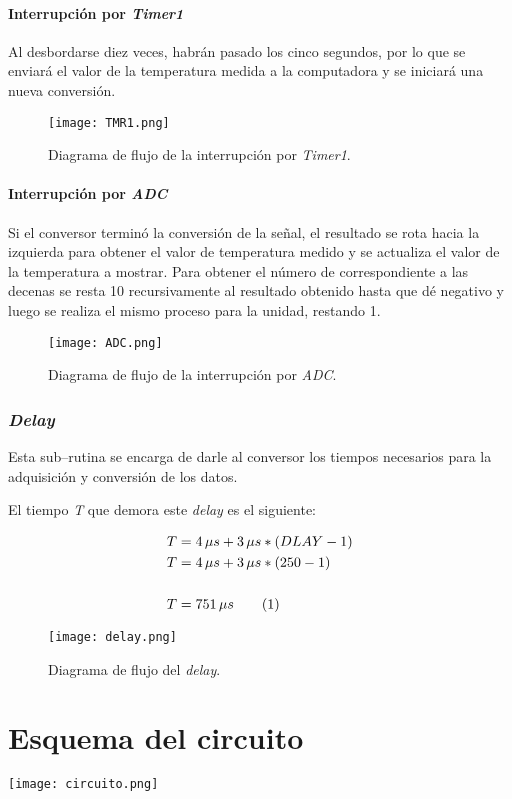 \documentclass[12pt,a4paper]{article}
\newcommand\numberthis{\addtocounter{equation}{1}\tag{\theequation}}
\begin{document}
	\newpage
	\paragraph{Interrupción por \emph{Timer1}} Al desbordarse diez veces, habrán pasado los cinco segundos, por lo que se enviará el valor de la temperatura medida a la computadora y se iniciará una nueva conversión.
	
	\begin{figure}[H]
	\texttt{[image: TMR1.png]}
	\centering
	\caption{Diagrama de flujo de la interrupción por \emph{Timer1}.}
	\label{TM1}
	\end{figure}
	
	\paragraph{Interrupción por \emph{ADC}} Si el conversor terminó la conversión de la señal, el resultado se rota hacia la izquierda para obtener el valor de temperatura medido y se actualiza el valor de la temperatura a mostrar. Para obtener el número de correspondiente a las decenas se resta 10 recursivamente al resultado obtenido hasta que dé negativo y luego se realiza el mismo proceso para la unidad, restando 1.
	
	\begin{figure}[H]
	\texttt{[image: ADC.png]}
	\centering
	\caption{Diagrama de flujo de la interrupción por \emph{ADC}.}
	\label{ADC}
	\end{figure}
	
	\subsubsection{\emph{Delay}}
	Esta sub--rutina se encarga de darle al conversor los tiempos necesarios para la adquisición y conversión de los datos.
	
	El tiempo \emph{T} que demora este \emph{delay} es el siguiente:
	
	\begin{align*}
	T &= 4\, \mu s + 3\,\mu s * (DLAY - 1)\\
	T &= 4\, \mu s + 3\,\mu s * (250 - 1)\\
	\\T &= 751\, \mu s \numberthis
	\end{align*}
	
	\begin{figure}[H]
	\texttt{[image: delay.png]}
	\centering
	\caption{Diagrama de flujo del \emph{delay}.}
	\end{figure}

\newpage
\section{Esquema del circuito}
\centering
\texttt{[image: circuito.png]}
	
\end{document}
